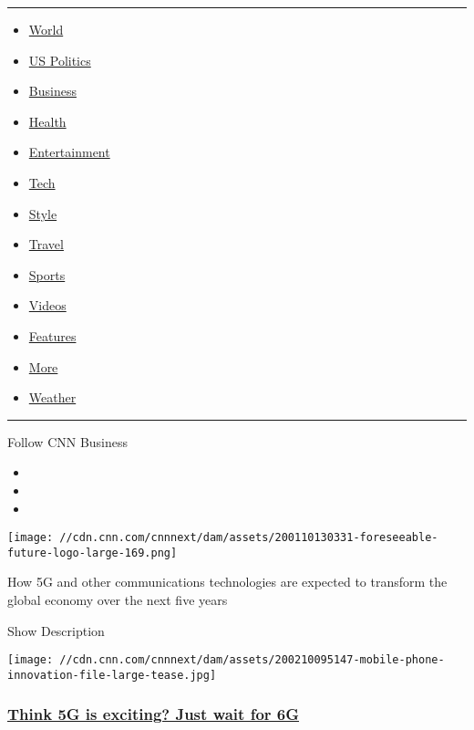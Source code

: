 \begin{center}\rule{0.5\linewidth}{\linethickness}\end{center}

\begin{itemize}
\tightlist
\item
  \href{/world}{World}
\item
  \href{/politics}{US Politics}
\item
  \href{/business}{Business}
\item
  \href{/health}{Health}
\item
  \href{/entertainment}{Entertainment}
\item
  \href{/business/tech}{Tech}
\item
  \href{/style}{Style}
\item
  \href{/travel}{Travel}
\item
  \href{/sport}{Sports}
\item
  \href{/videos}{Videos}
\item
  \href{/specials}{Features}
\item
  \href{/more}{More}
\item
  \href{/weather}{Weather}
\end{itemize}

\begin{center}\rule{0.5\linewidth}{\linethickness}\end{center}

Follow CNN Business

\begin{itemize}
\item
\item
\item
\end{itemize}

\texttt{[image: //cdn.cnn.com/cnnnext/dam/assets/200110130331-foreseeable-future-logo-large-169.png]}

How 5G and other communications technologies are expected to transform
the global economy over the next five years

Show Description

\href{/2020/02/10/perspectives/6g-future-communications/index.html}{}

\texttt{[image: //cdn.cnn.com/cnnnext/dam/assets/200210095147-mobile-phone-innovation-file-large-tease.jpg]}

\hypertarget{think-5g-is-exciting-just-wait-for-6g}{%
\subsubsection{\texorpdfstring{\href{/2020/02/10/perspectives/6g-future-communications/index.html}{Think
5G is exciting? Just wait for
6G}}{Think 5G is exciting? Just wait for 6G}}\label{think-5g-is-exciting-just-wait-for-6g}}

